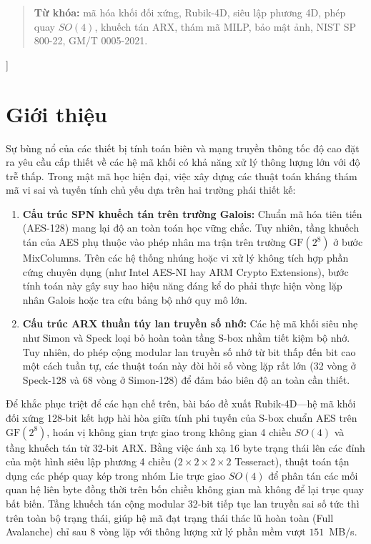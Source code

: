 \documentclass[10pt,twocolumn]{article}
\begin{document}
\begin{@twocolumnfalse}
\begin{quote}
      \noindent\textbf{Từ khóa:} mã hóa khối đối xứng, Rubik-4D, siêu lập phương 4D, phép quay $SO(4)$, khuếch tán ARX, thám mã MILP, bảo mật ảnh, NIST SP 800-22, GM/T 0005-2021.
    \end{quote}
    \vspace{0.6cm}
  \end{@twocolumnfalse}
]

\section{Giới thiệu}
\label{sec:intro}
Sự bùng nổ của các thiết bị tính toán biên và mạng truyền thông tốc độ cao đặt ra yêu cầu cấp thiết về các hệ mã khối có khả năng xử lý thông lượng lớn với độ trễ thấp. Trong mật mã học hiện đại, việc xây dựng các thuật toán kháng thám mã vi sai và tuyến tính chủ yếu dựa trên hai trường phái thiết kế:
\begin{enumerate}
    \item \textbf{Cấu trúc SPN khuếch tán trên trường Galois:} Chuẩn mã hóa tiên tiến (AES-128) mang lại độ an toàn toán học vững chắc. Tuy nhiên, tầng khuếch tán của AES phụ thuộc vào phép nhân ma trận trên trường $\text{GF}(2^8)$ ở bước $\text{MixColumns}$. Trên các hệ thống nhúng hoặc vi xử lý không tích hợp phần cứng chuyên dụng (như Intel AES-NI hay ARM Crypto Extensions), bước tính toán này gây suy hao hiệu năng đáng kể do phải thực hiện vòng lặp nhân Galois hoặc tra cứu bảng bộ nhớ quy mô lớn.
    \item \textbf{Cấu trúc ARX thuần túy lan truyền số nhớ:} Các hệ mã khối siêu nhẹ như Simon và Speck \cite{beaulieu2015simon} loại bỏ hoàn toàn tầng S-box nhằm tiết kiệm bộ nhớ. Tuy nhiên, do phép cộng modular lan truyền số nhớ từ bit thấp đến bit cao một cách tuần tự, các thuật toán này đòi hỏi số vòng lặp rất lớn (32 vòng ở Speck-128 và 68 vòng ở Simon-128) để đảm bảo biên độ an toàn cần thiết.
\end{enumerate}

Để khắc phục triệt để các hạn chế trên, bài báo đề xuất Rubik-4D—hệ mã khối đối xứng 128-bit kết hợp hài hòa giữa tính phi tuyến của S-box chuẩn AES trên $\text{GF}(2^8)$, hoán vị không gian trực giao trong không gian 4 chiều $SO(4)$ và tầng khuếch tán từ 32-bit ARX. Bằng việc ánh xạ 16 byte trạng thái lên các đỉnh của một hình siêu lập phương 4 chiều ($2 \times 2 \times 2 \times 2$ Tesseract), thuật toán tận dụng các phép quay kép trong nhóm Lie trực giao $SO(4)$ để phân tán các mối quan hệ liên byte đồng thời trên bốn chiều không gian mà không để lại trục quay bất biến. Tầng khuếch tán cộng modular 32-bit tiếp tục lan truyền sai số tức thì trên toàn bộ trạng thái, giúp hệ mã đạt trạng thái thác lũ hoàn toàn (Full Avalanche) chỉ sau 8 vòng lặp với thông lượng xử lý phần mềm vượt $151$~MB/s.
\end{document}
